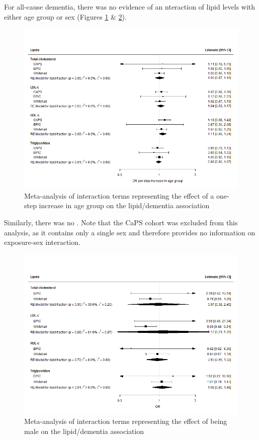\documentclass[a4paper, twoside]{templates/ociamthesis}
\begin{document}
For all-cause dementia, there was no evidence of an nteraction of lipid levels with either age group or sex (Figures \ref{fig:interactionDementiaAge} \& \ref{fig:interactionDementiaSex}).





\begin{figure}[H]
\includegraphics[width=1\linewidth]{figures/ipd/interaction_age_dementia} \caption[shortcap]{Meta-analysis of interaction terms representing the effect of a one-step increase in age group on the lipid/dementia association}\label{fig:interactionDementiaAge}
\end{figure}

Similarly, there was no . Note that the CaPS cohort was excluded from this analysis, as it contains only a single sex and therefore provides no information on exposure-sex interaction.





\begin{figure}[H]
\includegraphics[width=1\linewidth]{figures/ipd/interaction_sex_dementia} \caption[shortcap]{Meta-analysis of interaction terms representing the effect of being male on the lipid/dementia association}\label{fig:interactionDementiaSex}
\end{figure}
\end{document}
